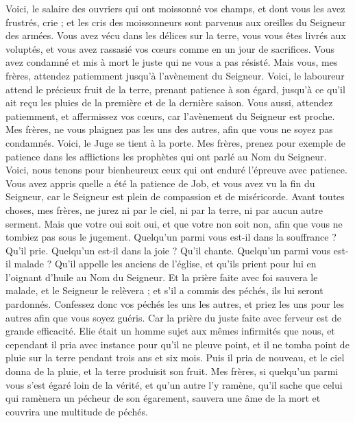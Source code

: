 \begin{multicols}{2}
Voici, le salaire des ouvriers qui ont moissonné vos champs, et dont vous les avez frustrés, crie ; et les cris des moissonneurs sont parvenus aux oreilles du Seigneur des armées.
Vous avez vécu dans les délices sur la terre, vous vous êtes livrés aux voluptés, et vous avez rassasié vos cœurs comme en un  jour de sacrifices.
Vous avez condamné et mis à mort le juste qui ne vous a pas résisté.
Mais vous, mes frères, attendez patiemment jusqu'à l'avènement du Seigneur. Voici, le laboureur attend le précieux fruit de la terre, prenant patience à son égard, jusqu'à ce qu'il ait reçu les pluies de la première et de la dernière saison.
Vous aussi, attendez patiemment, et affermissez vos cœurs, car l'avènement du Seigneur est proche.
Mes frères, ne vous plaignez pas les uns des autres, afin que vous ne soyez pas condamnés. Voici, le Juge se tient à la porte.
Mes frères, prenez pour exemple de patience dans les afflictions les prophètes qui ont parlé au Nom du Seigneur.
Voici, nous tenons pour bienheureux ceux qui ont enduré l'épreuve avec patience. Vous avez appris quelle a été la patience de Job, et vous avez vu la fin du Seigneur, car le Seigneur est plein de compassion et de miséricorde.
Avant toutes choses, mes frères, ne jurez ni par le ciel, ni par la terre, ni par aucun autre serment. Mais que votre oui soit oui, et que votre non soit non, afin que vous ne tombiez pas sous le jugement.
Quelqu'un parmi vous est-il dans la souffrance ? Qu'il prie. Quelqu'un est-il dans la joie ? Qu'il chante.
Quelqu'un parmi vous est-il malade ? Qu'il appelle les anciens de l'église, et qu'ils prient pour lui en l'oignant d'huile au Nom du Seigneur.
Et la prière faite avec foi sauvera le malade, et le Seigneur le relèvera ; et s'il a commis des péchés, ils lui seront pardonnés.
Confessez donc vos péchés les uns les autres, et priez les uns pour les autres afin que vous soyez guéris. Car la prière du juste faite avec ferveur est de grande efficacité.
Elie était un homme sujet aux mêmes infirmités que nous, et cependant il pria avec instance pour qu'il ne pleuve point, et il ne tomba point de pluie sur la terre pendant trois ans et six mois.
Puis il pria de nouveau, et le ciel donna de la pluie, et la terre produisit son fruit.
Mes frères, si quelqu'un parmi vous s'est égaré loin de la vérité, et qu'un autre l'y ramène,
qu'il sache que celui qui ramènera un pécheur de son égarement, sauvera une âme de la mort et couvrira une multitude de péchés.
\PPE{}
\end{multicols}
